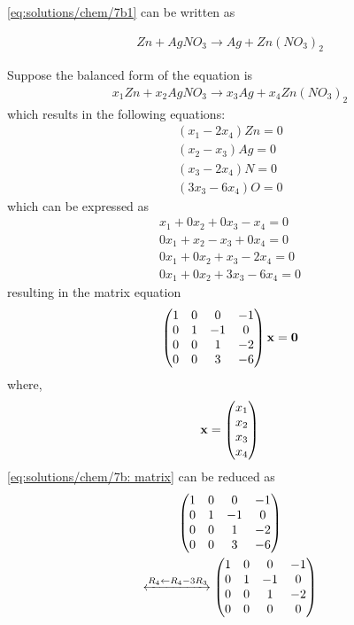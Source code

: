 
\ref{eq:solutions/chem/7b1}  can be written as 

\begin{align}
\label{eq:solutions/chem/7b2} Zn+ AgNO_{3} \to Ag + Zn(NO_{3})_{2}
\end{align}

Suppose the balanced form of the equation is 
\begin{align}
    \label{eq:solutions/chem/7b3} x_{1}Zn+ x_{2}AgNO_{3} \to x_{3}Ag + x_{4} Zn(NO_{3})_{2}
\end{align}
which results in the following equations:
\begin{align}
    ( x_{1} - 2x_{4} ) Zn = 0\\
    ( x_{2} - x_{3} ) Ag = 0\\
    ( x_{3} - 2 x_{4} ) N =0\\
    ( 3x_{3} - 6x_{4} ) O = 0
\end{align}
which can be expressed as
\begin{align}
    x_{1} + 0 x_{2} + 0 x_{3} - x_{4} = 0\\
    0 x_{1} + x_{2} - x_{3} + 0 x_{4} = 0\\
    0 x_{1} + 0 x_{2} + x_{3} - 2 x_{4} =0\\
    0 x_{1} + 0 x_{2} + 3x_{3} - 6 x_{4}= 0
\end{align}
resulting in the matrix equation
\begin{align}
    \label{eq:solutions/chem/7b: matrix}
    \begin{pmatrix} 1 & 0 & 0 & -1\\
           0 & 1 & -1 & 0\\
           0 & 0 & 1 & -2\\
           0 & 0 & 3 & -6 \end{pmatrix}\mathbf{x}
           =\mathbf{0}
\end{align}
where,
\begin{align}
   \mathbf{x}= \begin{pmatrix} x_{1}\\x_{2}\\x_{3}\\x_{4}\end{pmatrix}
\end{align}
\eqref{eq:solutions/chem/7b: matrix} can be reduced as
\begin{multline}
    \begin{pmatrix} 1 & 0 & 0 & -1\\
   	0 & 1 & -1 & 0\\
   	0 & 0 & 1 & -2\\
   	0 & 0 & 3 & -6 \end{pmatrix}
	\\
    \xleftrightarrow {R_{4}\leftarrow R_4 - 3R_3}
      \begin{pmatrix} 1 & 0 & 0 & -1\\
    	0 & 1 & -1 & 0\\
    	0 & 0 & 1 & -2\\
    	0 & 0 & 0 & 0 \end{pmatrix}
    \end{multline}

